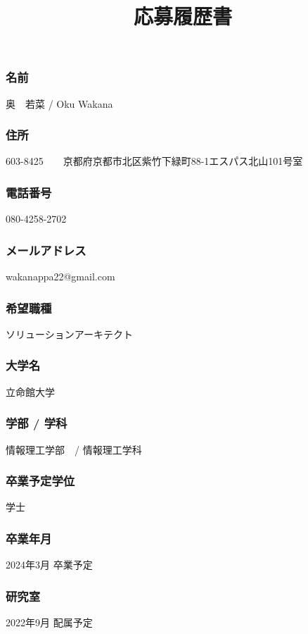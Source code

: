 \documentclass[dvipdfmx,autodetect-engine]{jsarticle}
\title{応募履歴書}
\author{\empty}
\date{\empty}
\begin{document}
 
 \maketitle

\subsubsection*{名前}
奥　若菜  /  Oku Wakana
\subsubsection*{住所}
603-8425　　京都府京都市北区紫竹下緑町88-1エスパス北山101号室

\subsubsection*{電話番号}
080-4258-2702

\subsubsection*{メールアドレス}
wakanappa22@gmail.com

\subsubsection*{希望職種}
ソリューションアーキテクト

\subsubsection*{大学名}
立命館大学

\subsubsection*{学部 / 学科}
情報理工学部　/ 情報理工学科

\subsubsection*{卒業予定学位}
学士

\subsubsection*{卒業年月}
2024年3月 卒業予定

\subsubsection*{研究室}
2022年9月 配属予定
\end{document}
